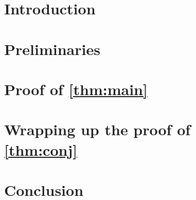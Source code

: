\documentclass[11pt,a4paper]{article}
\theoremstyle{plain}
\theoremstyle{nonumberplain}
\begin{document}
\section{Introduction}


\section{Preliminaries}\label{sec:prelims}


\section{Proof of \cref{thm:main}}\label{sec:main}


\section{Wrapping up the proof of \cref{thm:conj}}\label{sec:wrap-up}


\section{Conclusion}




\end{document}
